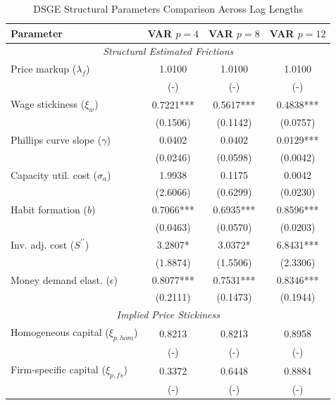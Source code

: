 \begin{table}[htpb]
    \centering
    \small
    \renewcommand{\arraystretch}{1.2}
    \caption{DSGE Structural Parameters Comparison Across Lag Lengths}
    \label{tab:dsge_params_comparison_4_8_12}
    \begin{tabular}{lccc}
    \toprule
    \textbf{Parameter} & \textbf{VAR $p=4$} & \textbf{VAR $p=8$} & \textbf{VAR $p=12$} \\
    \midrule \multicolumn{4}{c}{\textit{Structural Estimated Frictions}} \\
    Price markup ($\lambda_f$) & 1.0100 & 1.0100 & 1.0100 \\
    & (-) & (-) & (-) \\
    Wage stickiness ($\xi_w$) & 0.7221*** & 0.5617*** & 0.4838*** \\
    & (0.1506) & (0.1142) & (0.0757) \\
    Phillips curve slope ($\gamma$) & 0.0402 & 0.0402 & 0.0129*** \\
    & (0.0246) & (0.0598) & (0.0042) \\
    Capacity util. cost ($\sigma_a$) & 1.9938 & 0.1175 & 0.0042 \\
    & (2.6066) & (0.6299) & (0.0230) \\
    Habit formation ($b$) & 0.7066*** & 0.6935*** & 0.8596*** \\
    & (0.0463) & (0.0570) & (0.0203) \\
    Inv. adj. cost ($S^{\prime\prime}$) & 3.2807* & 3.0372* & 6.8431*** \\
    & (1.8874) & (1.5506) & (2.3306) \\
    Money demand elast. ($\epsilon$) & 0.8077*** & 0.7531*** & 0.8346*** \\
    & (0.2111) & (0.1473) & (0.1944) \\
    \midrule \multicolumn{4}{c}{\textit{Implied Price Stickiness}} \\
    Homogeneous capital ($\xi_{p, hom}$) & 0.8213 & 0.8213 & 0.8958 \\
    & (-) & (-) & (-) \\
    Firm-specific capital ($\xi_{p, fs}$) & 0.3372 & 0.6448 & 0.8884 \\
    & (-) & (-) & (-) \\
    \bottomrule
    \end{tabular}
\end{table}

